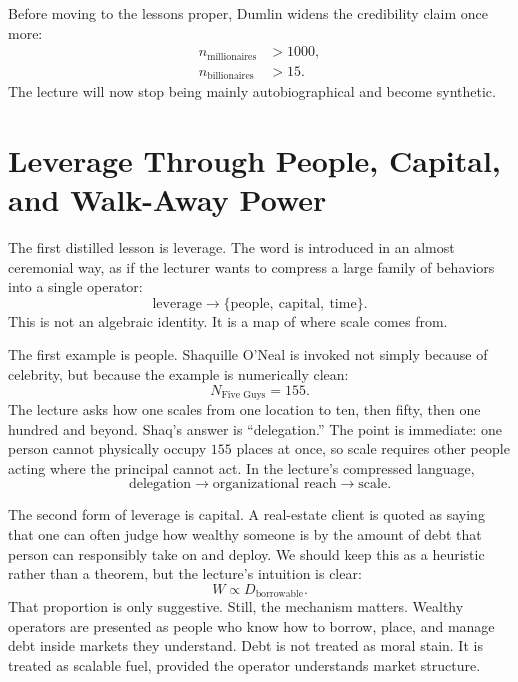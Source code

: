 Before moving to the lessons proper, Dumlin widens the credibility claim once more:
\begin{align}
n_{\text{millionaires}} &> 1000, \\
n_{\text{billionaires}} &> 15.
\end{align}
The lecture will now stop being mainly autobiographical and become synthetic.

\section{Leverage Through People, Capital, and Walk-Away Power}

The first distilled lesson is leverage. The word is introduced in an almost ceremonial way, as if the lecturer wants to compress a large family of behaviors into a single operator:
\begin{equation}
\text{leverage} \to \{\text{people},\ \text{capital},\ \text{time}\}.
\end{equation}
This is not an algebraic identity. It is a map of where scale comes from.

The first example is people. Shaquille O'Neal is invoked not simply because of celebrity, but because the example is numerically clean:
\begin{equation}
N_{\text{Five Guys}} = 155.
\end{equation}
The lecture asks how one scales from one location to ten, then fifty, then one hundred and beyond. Shaq's answer is ``delegation.'' The point is immediate: one person cannot physically occupy \(155\) places at once, so scale requires other people acting where the principal cannot act. In the lecture's compressed language,
\begin{equation}
\text{delegation} \to \text{organizational reach} \to \text{scale}.
\end{equation}

The second form of leverage is capital. A real-estate client is quoted as saying that one can often judge how wealthy someone is by the amount of debt that person can responsibly take on and deploy. We should keep this as a heuristic rather than a theorem, but the lecture's intuition is clear:
\begin{equation}
W \propto D_{\text{borrowable}}.
\end{equation}
That proportion is only suggestive. Still, the mechanism matters. Wealthy operators are presented as people who know how to borrow, place, and manage debt inside markets they understand. Debt is not treated as moral stain. It is treated as scalable fuel, provided the operator understands market structure.

